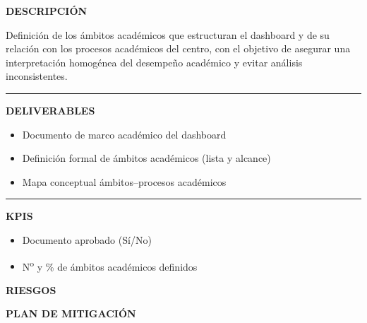 \documentclass[11pt,a4paper]{scrreprt}
\newcommand{\fieldlabel}[1]{%
  {\footnotesize\sffamily\bfseries\color{mutedcolor}\MakeUppercase{#1}}\par\nopagebreak[4]
}
\newcommand{\fieldsep}{\vspace{3pt}\noindent\textcolor{bordercolor}{\rule{\linewidth}{0.4pt}}\vspace{3pt}\par}
\begin{document}
\begin{tcolorbox}[pabox={dashcolor}{PA1.1 \enspace\textbullet\enspace Definición del marco académico y de los ámbitos del dashboard}]

\fieldlabel{Descripci\'on}
{\small Definición de los ámbitos académicos que estructuran el dashboard y de su relación con los procesos académicos del centro, con el objetivo de asegurar una interpretación homogénea del desempeño académico y evitar análisis inconsistentes.}\par
\fieldsep
\fieldlabel{Deliverables}
{\small \begin{itemize}[noitemsep,topsep=2pt]
\item Documento de marco académico del dashboard
\item Definición formal de ámbitos académicos (lista y alcance)
\item Mapa conceptual ámbitos--procesos académicos
\end{itemize}}\par
\fieldsep
\fieldlabel{KPIs}
{\small \begin{itemize}[noitemsep,topsep=2pt]
\item Documento aprobado (Sí/No)
\item N\textsuperscript{o} y \% de ámbitos académicos definidos
\end{itemize}}\par
\end{tcolorbox}
\begin{tcolorbox}[riskbox]
{\footnotesize\sffamily\bfseries\color{red!50!black} RIESGOS}\par{}
\end{tcolorbox}
\begin{tcolorbox}[mitbox]
{\footnotesize\sffamily\bfseries\color{green!40!black} PLAN DE MITIGACI\'ON}\par{}
\end{tcolorbox}
\vspace{8pt}
\end{document}
